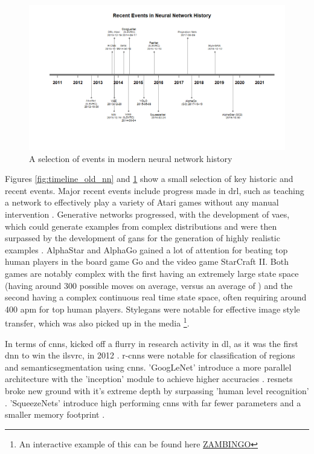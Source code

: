 \begin{figure}
    \centering
    \includegraphics[width=140mm,scale=1.5]{figs/timeline_new_nn.png}
    \caption{A selection of events in modern neural network history}
    \label{fig:timeline_new_nn}
\end{figure}

Figures \ref{fig:timeline_old_nn} and \ref{fig:timeline_new_nn} show a small selection of key historic and recent events. Major recent events include progress made in \gls{drl}, such as teaching a network to effectively play a variety of Atari games without any manual intervention \cite{drl_atari}. Generative networks progressed, with the development of \gls{vae}s, which could generate examples from complex distributions and were then surpassed by the development of \gls{gan}s for the generation of highly realistic examples \cite{gan}. AlphaStar  \cite{alpha_star} and AlphaGo \cite{alpha_go} gained a lot of attention \cite{press_alpha_go} \cite{press_alpha_star} for beating top human players in the board game Go and the video game StarCraft II. Both games are notably complex with the first having an extremely large state space (having around 300 possible moves on average, versus an average of \cite{moves_chess_go}) and the second having a complex continuous real time state space, often requiring  around 400 \gls{apm} \cite{sc_apm} for top human players. Style\gls{gan}s were notable for effective image style transfer, which was also picked up in the media \cite{press_stylegan} \footnote{An interactive example of this can be found here \url{ZAMBINGO}}.

In terms of \gls{cnn}s, kicked off a flurry in research activity in \gls{dl}, as it was the first \gls{dnn} to win the \gls{ilsvrc}, in 2012 \cite{alex_net}. \gls{r-cnn}s were notable for classification of regions and \gls{semanticsegmentation} using \gls{cnn}s. 'GoogLeNet' introduce a more parallel architecture with the 'inception' module to achieve higher accuracies \cite{googlenet}. \gls{resnet}s broke new ground with it's extreme depth \cite{resnet} by surpassing 'human level recognition' \cite{resnet_human}. 'SqueezeNets' introduce high performing \gls{cnn}s with far fewer parameters and a smaller memory footprint \cite{squeeze_net}. 
\bigskip

